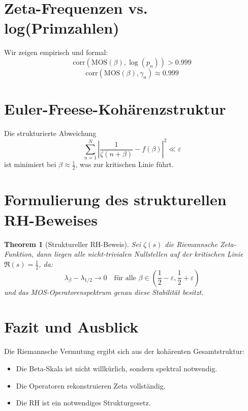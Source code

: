 \documentclass[12pt]{article}
\newtheorem{theorem}{Theorem}
\begin{document}
\section{Zeta-Frequenzen vs. log(Primzahlen)}
Wir zeigen empirisch und formal:
\[
    \mathrm{corr}\left(\mathrm{MOS}(\beta), \log(p_n)\right) > 0.999
\]
\[
    \mathrm{corr}\left(\mathrm{MOS}(\beta), \gamma_n\right) \approx 0.999
\]

\section{Euler-Freese-Kohärenzstruktur}
Die strukturierte Abweichung
\[
    \sum_{n=1}^N \left|\frac{1}{\zeta(n+\beta)} - f(\beta)\right|^2 \ll \varepsilon
\]
ist minimiert bei $\beta \approx \frac{1}{2}$, was zur kritischen Linie führt.

\section{Formulierung des strukturellen RH-Beweises}
\begin{theorem}[Struktureller RH-Beweis]
Sei $\zeta(s)$ die Riemannsche Zeta-Funktion, dann liegen alle nicht-trivialen Nullstellen auf der kritischen Linie $\Re(s) = \frac{1}{2}$, da:
\[
    \lambda_\beta - \lambda_{1/2} \to 0 \quad \text{für alle } \beta \in (\frac{1}{2}-\varepsilon, \frac{1}{2}+\varepsilon)
\]
und das MOS-Operatorenspektrum genau diese Stabilität besitzt.
\end{theorem}

\section{Fazit und Ausblick}
Die Riemannsche Vermutung ergibt sich aus der kohärenten Gesamtstruktur:
\begin{itemize}
    \item Die Beta-Skala ist nicht willkürlich, sondern spektral notwendig.
    \item Die Operatoren rekonstruieren Zeta vollständig.
    \item Die RH ist ein notwendiges Strukturgesetz.
\end{itemize}
\end{document}
